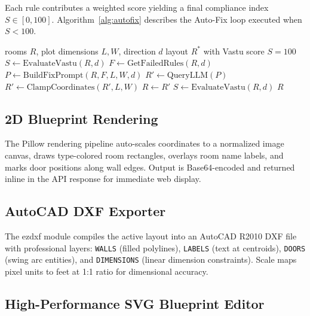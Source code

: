 \documentclass[10pt, twocolumn, letterpaper]{article}
\begin{document}
  Each rule contributes a weighted score yielding a final compliance index
  $S \in [0,100]$. Algorithm~\ref{alg:autofix} describes the Auto-Fix loop
  executed when $S < 100$.

  \begin{algorithm}[ht]
  \caption{Vastu Auto-Fix Iterative Correction}
  \label{alg:autofix}
  \begin{algorithmic}[1]
  \REQUIRE rooms $R$, plot dimensions $L, W$, direction $d$
  \ENSURE layout $R^*$ with Vastu score $S = 100$
  \STATE $S \leftarrow \text{EvaluateVastu}(R, d)$
    \STATE $F \leftarrow \text{GetFailedRules}(R, d)$
    \STATE $P \leftarrow \text{BuildFixPrompt}(R, F, L, W, d)$
    \STATE $R' \leftarrow \text{QueryLLM}(P)$
    \STATE $R' \leftarrow \text{ClampCoordinates}(R', L, W)$
    \STATE $R \leftarrow R'$
    \STATE $S \leftarrow \text{EvaluateVastu}(R, d)$
  \ENDWHILE
  \RETURN $R$
  \end{algorithmic}
  \end{algorithm}

  \subsection{2D Blueprint Rendering}

  The Pillow rendering pipeline auto-scales coordinates to a normalized image
  canvas, draws type-colored room rectangles, overlays room name labels, and
  marks door positions along wall edges. Output is Base64-encoded and returned
  inline in the API response for immediate web display.

  \subsection{AutoCAD DXF Exporter}

  The ezdxf module compiles the active layout into an AutoCAD R2010 DXF file
  with professional layers: \texttt{WALLS} (filled polylines), \texttt{LABELS}
  (text at centroids), \texttt{DOORS} (swing arc entities), and
  \texttt{DIMENSIONS} (linear dimension constraints). Scale maps pixel units to
  feet at 1:1 ratio for dimensional accuracy.

  \subsection{High-Performance SVG Blueprint Editor}
\end{document}

